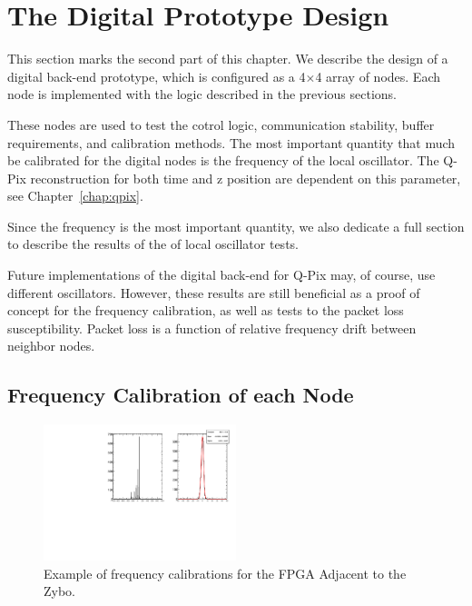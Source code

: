 \section{The Digital Prototype Design}

This section marks the second part of this chapter.
We describe the design of a digital back-end prototype, which is configured as a 4$\times$4 array of nodes.
Each node is implemented with the logic described in the previous sections.

These nodes are used to test the cotrol logic, communication stability, buffer requirements, and calibration methods.
The most important quantity that much be calibrated for the digital nodes is the frequency of the local oscillator.
The Q-Pix reconstruction for both time and z position are dependent on this parameter, see Chapter~\ref{chap:qpix}.

Since the frequency is the most important quantity, we also dedicate a full section to describe the results of the of local oscillator tests.

Future implementations of the digital back-end for Q-Pix may, of course, use different oscillators.
However, these results are still beneficial as a proof of concept for the frequency calibration, as well as tests to the packet loss susceptibility.
Packet loss is a function of relative frequency drift between neighbor nodes.

\subsection{Frequency Calibration of each Node}




\begin{figure}[]
\centering
\includegraphics[width=0.5\textwidth]{images/(0,0).pdf}
\caption{Example of frequency calibrations for the FPGA Adjacent to the Zybo.}
\end{figure}


